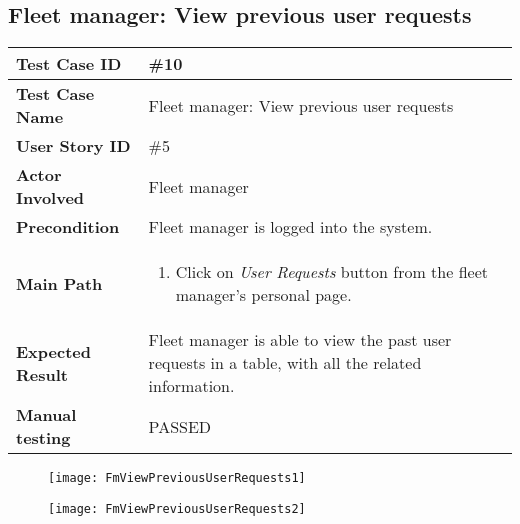 \subsection{Fleet manager: View previous user requests}
\begin{center}
	\begin{tabular} { | m{3.5cm} | m{9.5cm} | }
		\hline
		\textbf{Test Case ID} & \#10\\
		\hline
		\textbf{Test Case Name} & Fleet manager: View previous user requests\\
		\hline
		\textbf{User Story ID} & \#5 \\
		\hline
		\textbf{Actor Involved} & Fleet manager\\
		\hline
		\textbf{Precondition} & Fleet manager is logged into the system.\\
		\hline
		\textbf{Main Path} & 
		\begin{enumerate}
			\item Click on \textit{User Requests} button from the fleet manager's personal page.
		\end{enumerate}\\
		\hline
		\textbf{Expected Result} & Fleet manager is able to view the past user requests in a table, with all the related information.\\
		\hline
	\textbf{Manual testing} & PASSED\\
	\hline
\end{tabular}
\end{center}
\begin{figure}[H]
\centering
\texttt{[image: FmViewPreviousUserRequests1]}
\end{figure}
\begin{figure}[H]
\centering
\texttt{[image: FmViewPreviousUserRequests2]}
\end{figure}
\newpage
